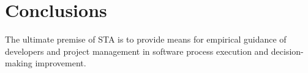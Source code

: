 \chapter{Conclusions}
The ultimate premise of STA is to provide means for empirical guidance of developers and project 
management in software process execution and decision-making improvement.

